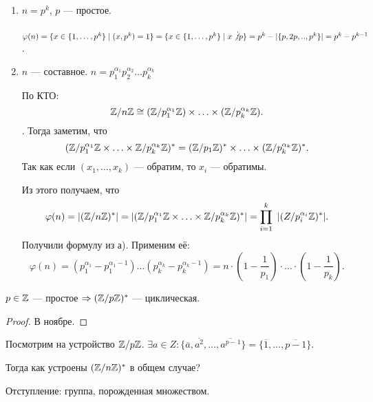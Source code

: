  \begin{enumerate}
     \item $n = p^k$, $p$ --- простое.

         $\varphi(n) = \{x \in \{1,\ldots,p^k\} \mid (x, p^k)=1\} = \{x \in \{1,\ldots, p^k\} \mid x \not \vdots p\} = p^k - |\{p, 2p,..,p^k\}| = p^k - p^{k-1}$.
     \item $n$ --- составное. $n = p_1^{\alpha_1}p_2^{\alpha_2}\ldots p_k^{\alpha_k}$

         По КТО:  \[\mathbb{Z} / n\mathbb{Z} \cong (\mathbb{Z} / p_1^{\alpha_1} \mathbb{Z}) \times \ldots \times (\mathbb{Z} / p_k^{\alpha_k} \mathbb{Z}).\].
         Тогда заметим, что \[
             (\mathbb{Z} / p_1^{\alpha_1} \mathbb{Z} \times \ldots \times \mathbb{Z} / p_k^{\alpha_k} \mathbb{Z})^* = (\mathbb{Z} / p_1 \mathbb{Z})^* \times \ldots \times (\mathbb{Z} / p_k^{\alpha_k} \mathbb{Z})^*
         .\] Так как если $(x_1,\ldots,x_k)$ --- обратим, то $x_i$ --- обратимы.

         Из этого получаем, что  \[\varphi(n) = |(\mathbb{Z} / n\mathbb{Z})^*| = |(\mathbb{Z} / p_1^{\alpha_1} \mathbb{Z} \times \ldots \times \mathbb{Z} / p_k^{\alpha_k} \mathbb{Z})^*| = \prod_{i=1}^k\ |(Z / p_i^{\alpha_i} \mathbb{Z})^*|.\]
         Получили формулу из а). Применим её: \[
             \varphi(n) = (p_1^{\alpha_1} - p_1^{\alpha_1 - 1})\ldots(p_k^{\alpha_k} - p_k^{\alpha_k - 1}) = n \cdot (1 - \frac{1}{p_1})\cdot\ldots\cdot(1-\frac{1}{p_k})
         .\] 
 \end{enumerate}
 \begin{theorem}
     $p \in \mathbb{Z}$ --- простое  $\Rightarrow (\mathbb{Z} / p\mathbb{Z})^*$ --- циклическая.
 \end{theorem}
 \begin{proof}
     В ноябре.
 \end{proof}
 \slashn
 Посмотрим на устройство $\mathbb{Z} / p\mathbb{Z}$.  $\exists a \in Z: \{\overline{a}, \overline{a^2},\ldots,\overline{a^{p-1}}\} = \{\overline{1}, \ldots, \overline{p-1}\}$.

 Тогда как устроены $(\mathbb{Z} / n \mathbb{Z})^*$ в общем случае?

 Отступление: группа, порожденная множеством.

